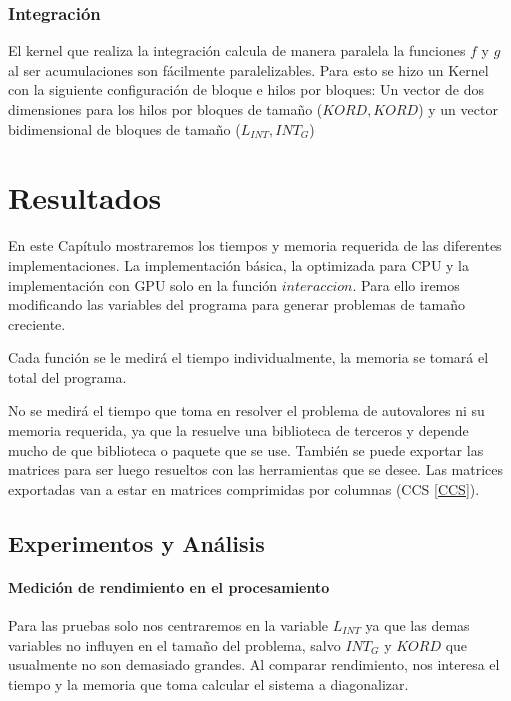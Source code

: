 \documentclass[a4paper,openright,12pt, oneside]{book}
\begin{document}
\subsection{Integraci\'on}
El kernel que realiza la integraci\'on calcula de manera paralela la funciones $f$ y $g$ al ser acumulaciones son f\'acilmente paralelizables. 
Para esto se hizo un Kernel con la siguiente configuraci\'on de bloque e hilos por bloques: Un vector de dos dimensiones para los hilos por bloques de tama\~no ($KORD, KORD$) y un vector bidimensional de bloques de tama\~no ($L_{INT}, {INT}_{G}$)


\setcounter{chapter}{5}
\setcounter{section}{0}
\chapter*{Resultados}\label{Resultados}
\markboth{}{} %

En este Cap\'itulo mostraremos los tiempos y memoria requerida de las diferentes implementaciones. La implementaci\'on b\'asica, la optimizada para CPU y la implementaci\'on con GPU solo en la funci\'on $interaccion$.
Para ello iremos modificando las variables del programa para generar problemas de tama\~no creciente. 

Cada funci\'on se le medir\'a el tiempo individualmente, la memoria se tomar\'a el total del programa.

No se medir\'a el tiempo que toma en resolver el problema de autovalores ni su memoria requerida, ya que la resuelve una biblioteca de terceros y depende mucho de que biblioteca o paquete que se use. Tambi\'en se puede exportar las matrices para ser luego resueltos con las herramientas que se desee. Las matrices exportadas van a estar en matrices comprimidas por columnas (CCS \ref{CCS}).

\section{Experimentos y An\'alisis}

\subsubsection{Medici\'on de rendimiento en el procesamiento}
Para las pruebas solo nos centraremos en la variable $L_{INT}$ ya que las demas variables no influyen en el tama\~no del problema, salvo $INT_G$ y $KORD$ que usualmente no son demasiado grandes.
Al comparar rendimiento, nos interesa el tiempo y la memoria que toma calcular el sistema a diagonalizar. 
\end{document}
